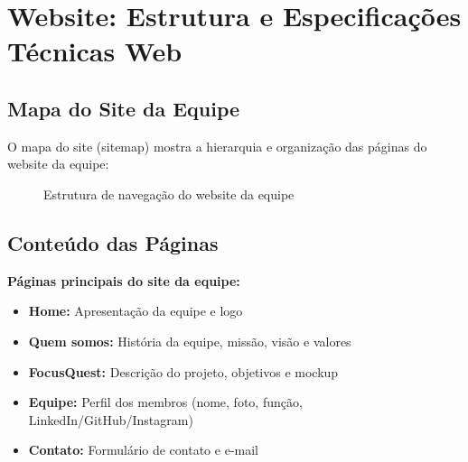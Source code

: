 \documentclass[11pt,a4paper]{article}
\begin{document}
\section{Website: Estrutura e Especificações Técnicas Web}

\subsection{Mapa do Site da Equipe}

O mapa do site (sitemap) mostra a hierarquia e organização das páginas do website da equipe:

\begin{figure}[H]
\centering
{}
\caption{Estrutura de navegação do website da equipe}
\label{fig:sitemap}
\end{figure}

\subsection{Conteúdo das Páginas}

\textbf{Páginas principais do site da equipe:}

\begin{itemize}
    \item \textbf{Home:} Apresentação da equipe e logo
    \item \textbf{Quem somos:} História da equipe, missão, visão e valores
    \item \textbf{FocusQuest:} Descrição do projeto, objetivos e mockup
    \item \textbf{Equipe:} Perfil dos membros (nome, foto, função, LinkedIn/GitHub/Instagram)
    \item \textbf{Contato:} Formulário de contato e e-mail
\end{itemize}
\end{document}
